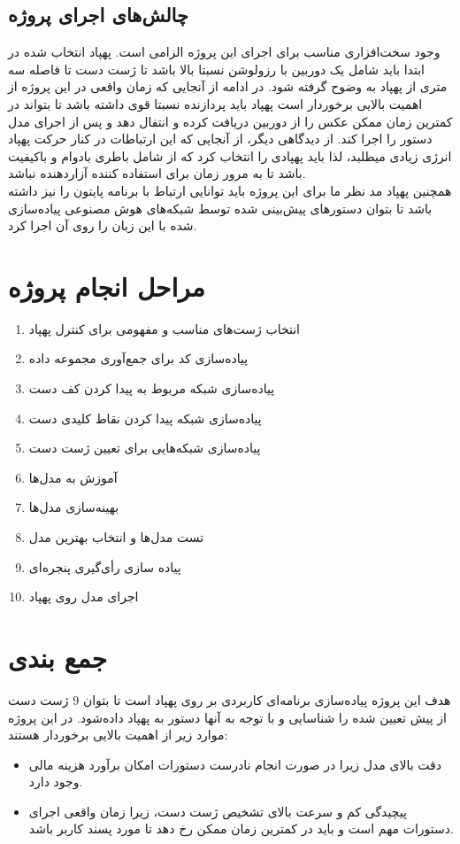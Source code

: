 \subsection{چالش‌های اجرای پروژه}
وجود سخت‌افزاری مناسب برای اجرای این پروژه الزامی است. پهپاد انتخاب شده در ابتدا باید شامل یک دوربین با رزولوشن نسبتا بالا باشد تا  ژست دست تا فاصله سه متری از پهپاد به وضوح گرفته شود.
در ادامه از آنجایی که زمان واقعی در این پروژه از اهمیت بالایی برخوردار است پهپاد باید پردازنده نسبتا قوی داشته باشد تا بتواند در کمترین زمان ممکن عکس را از دوربین دریافت کرده و انتفال دهد و پس از اجرای مدل دستور را اجرا کند. از دیدگاهی دیگر، از آنجایی که این ارتباطات در کنار حرکت پهپاد انرژی زیادی میطلبد، لذا باید پهپادی را انتخاب کرد
که از شامل باطری بادوام و باکیفیت باشد تا به مرور زمان برای استفاده کننده آزاردهنده نباشد.
\\
همچنین پهپاد مد نظر ما برای این پروژه باید توانایی ارتباط با برنامه پایتون را نیز داشته باشد تا بتوان دستورهای پیش‌بینی شده توسط شبکه‌های هوش مصنوعی پیاده‌سازی شده با این زبان را روی آن اجرا کرد.


\section{مراحل انجام پروژه}
\begin{enumerate}
    \item  انتخاب ژست‌های مناسب و مفهومی برای کنترل پهپاد
    \item  پیاده‌سازی کد برای جمع‌آوری مجموعه داده
    \item  پیاده‌سازی شبکه مربوط به پیدا کردن کف دست 
    \item  پیاده‌سازی شبکه پیدا کردن نقاط کلیدی دست 
    \item  پیاده‌سازی شبکه‌هایی برای تعیین ژست دست
    \item  آموزش به مدل‌ها
    \item  بهینه‌سازی مدل‌ها
    \item  تست مدل‌ها و انتخاب بهترین مدل
    \item  پیاده سازی رأی‌گیری پنجره‌ای
    \item  اجرای مدل روی پهپاد
\end{enumerate}
 

\section{جمع بندی}
 هدف این پروژه پیاده‌سازی برنامه‌ای کاربردی بر روی پهپاد است تا بتوان 9 ژست دست از پیش تعیین شده را شناسایی و با توجه به آنها دستور به پهپاد داده‌شود.
 در این پروژه موارد زیر از اهمیت بالایی برخوردار هستند:
 \begin{itemize}
    \item دقت بالای مدل زیرا در صورت انجام نادرست دستورات امکان برآورد هزینه مالی وجود دارد.
    \item پیچیدگی کم و سرعت بالای تشخیص ژست دست، زیرا زمان واقعی اجرای دستورات مهم است و باید در کمترین زمان ممکن رخ دهد تا مورد پسند کاربر باشد.
\end{itemize}


